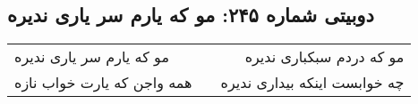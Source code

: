 \begin{center}
\section*{دوبیتی شماره ۲۴۵: مو که یارم سر یاری ندیره}
\label{sec:245}
\begin{longtable}{l p{0.5cm} r}
مو که یارم سر یاری ندیره
&&
مو که دردم سبکباری ندیره
\\
همه واجن که یارت خواب نازه
&&
چه خوابست اینکه بیداری ندیره
\\
\end{longtable}
\end{center}
